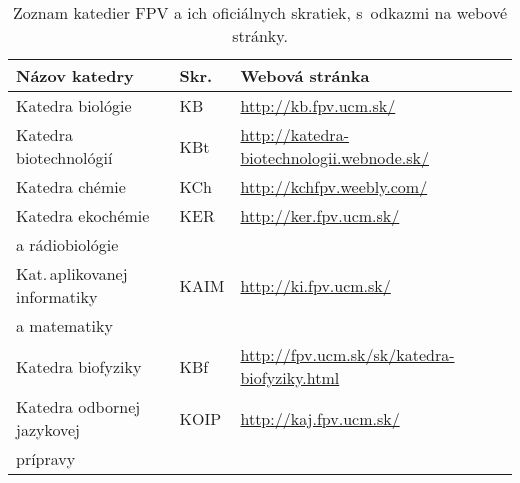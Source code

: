 \begin{table}
  \centering\small
  \caption[Zoznam katedier FPV]%
  {Zoznam katedier FPV a ich oficiálnych skratiek, s~odkazmi na webové stránky.}
  \label{tab:department.review}
  \begin{tabularx}{\textwidth}{lll}
    \toprule
    Názov katedry & Skr. & Webová stránka \\
    \midrule
    Katedra biológie              & KB   & {\footnotesize \url{http://kb.fpv.ucm.sk/}}                       \\[0.5ex]
    Katedra biotechnológií        & KBt  & {\footnotesize \url{http://katedra-biotechnologii.webnode.sk/}}   \\[0.5ex]
    Katedra chémie                & KCh  & {\footnotesize \url{http://kchfpv.weebly.com/}}                   \\[0.5ex]
    Katedra ekochémie             & KER  & {\footnotesize \url{http://ker.fpv.ucm.sk/}}                      \\[-0.25ex]
    a rádiobiológie               &      &                                                                   \\[0.5ex]
    Kat.\,aplikovanej informatiky & KAIM & {\footnotesize \url{http://ki.fpv.ucm.sk/}}                       \\[-0.25ex]
    a matematiky                  &      &                                                                   \\[0.5ex]
    Katedra biofyziky             & KBf  & {\footnotesize \url{http://fpv.ucm.sk/sk/katedra-biofyziky.html}} \\[0.5ex]
    Katedra odbornej jazykovej    & KOIP & {\footnotesize \url{http://kaj.fpv.ucm.sk/}}                      \\[-0.25ex]
    prípravy                      &      &                                                                   \\
    \bottomrule
  \end{tabularx}
\end{table}

